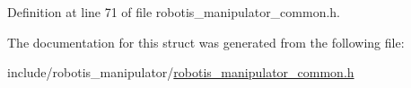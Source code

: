 Definition at line 71 of file robotis\+\_\+manipulator\+\_\+common.\+h.



The documentation for this struct was generated from the following file\+:\begin{DoxyCompactItemize}
\item 
include/robotis\+\_\+manipulator/\hyperlink{robotis__manipulator__common_8h}{robotis\+\_\+manipulator\+\_\+common.\+h}\end{DoxyCompactItemize}
